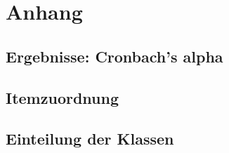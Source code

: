 \documentclass[12pt, bibliography=totoc]{scrartcl}
\begin{document}
\pagebreak
\printbibliography
\pagebreak
\appendix


  \section{Anhang}
  \subsection{Ergebnisse: Cronbach's alpha}
  \label{sec:cron}
  
  \subsection{Itemzuordnung}
  \label{sec:item}
  
  \subsection{Einteilung der Klassen}
  \label{sec:klasse}
  
\end{document}
